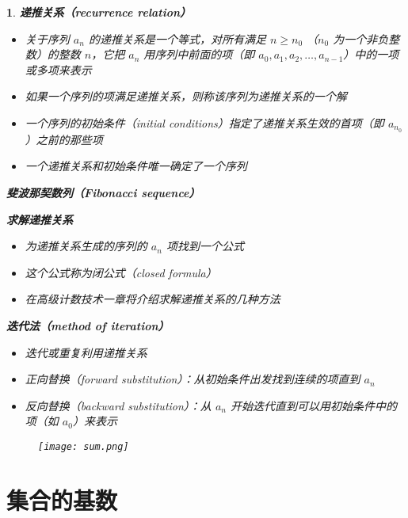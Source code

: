 \documentclass[UTF8]{report}
\theoremstyle{MyLineTheoremStyle} %
\theoremstyle{MyBlockTheoremStyle} %
\theoremstyle{MySubsubsectionStyle} %
\newtheorem{definition}{}
\begin{document}
\begin{definition}
    \textbf{递推关系（recurrence relation）}\par
    \begin{itemize}
        \item 关于序列 $a_n$ 的递推关系是一个等式，对所有满足 $n \geq n_0$ （$n_0$ 为一个非负整数）的整数 $n$，它把 $a_n$ 用序列中前面的项（即 $a_0, a_1, a_2, \ldots, a_{n-1}$）中的一项或多项来表示
        \item 如果一个序列的项满足递推关系，则称该序列为递推关系的一个解
        \item 一个序列的初始条件（initial conditions）指定了递推关系生效的首项（即 $a_{n_0}$）之前的那些项
        \item 一个递推关系和初始条件唯一确定了一个序列
    \end{itemize}

    \textbf{斐波那契数列（Fibonacci sequence）}\par

    \textbf{求解递推关系}\par
    \begin{itemize}
        \item 为递推关系生成的序列的 $a_n$ 项找到一个公式
        \item 这个公式称为闭公式（closed formula）
        \item 在高级计数技术一章将介绍求解递推关系的几种方法
    \end{itemize}

    \textbf{迭代法（method of iteration）}\par
    \begin{itemize}
        \item 迭代或重复利用递推关系
        \item 正向替换（forward substitution）：从初始条件出发找到连续的项直到 $a_n$
        \item 反向替换（backward substitution）：从 $a_n$ 开始迭代直到可以用初始条件中的项（如 $a_0$）来表示
    \end{itemize}
    \begin{figure}[ht]
        \centering
        \texttt{[image: sum.png]}
    \end{figure}
\end{definition}

\section{集合的基数}
\end{document}
